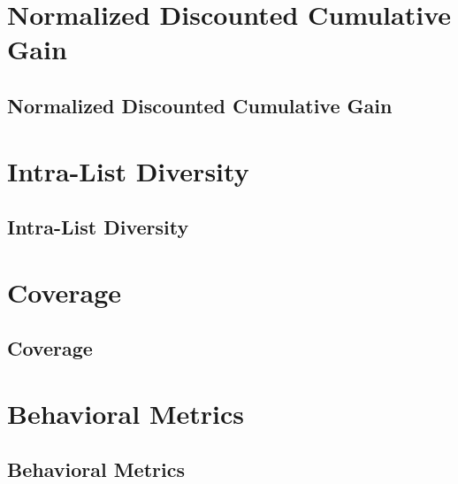 \clearpage
\thispagestyle{rankingstyle}
\section{Normalized Discounted Cumulative Gain}
\subsection{Normalized Discounted Cumulative Gain}



\clearpage
\thispagestyle{rankingstyle}
\section{Intra-List Diversity}
\subsection{Intra-List Diversity}

\clearpage
\thispagestyle{rankingstyle}
\section{Coverage}
\subsection{Coverage}

\clearpage
\thispagestyle{rankingstyle}
\section{Behavioral Metrics}
\subsection{Behavioral Metrics}


